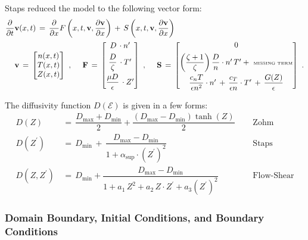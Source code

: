 \documentclass[a4paper,8pt]{article}
\begin{document}
Staps reduced the model to the following vector form:
\small\begin{align}
    \dfrac{\partial}{\partial t} \mathbf{v}&(x,t) \,=\, \dfrac{\partial}{\partial x} F\left(x, t, \mathbf{v}, \dfrac{\partial\mathbf{v}}{\partial x}\right) \,+\, S\left(x, t, \mathbf{v}, \dfrac{\partial\mathbf{v}}{\partial x}\right) \\
\mathbf{v}& \,=\,\begin{bmatrix} n(x, t) \\ T(x, t) \\ Z(x, t) \end{bmatrix}~,~~~~
\mathbf{F} \,=\, \begin{bmatrix}
            D\,\cdot n^\prime \\[1ex]
            \dfrac{D}{\zeta}\,\cdot T^\prime \\[2ex]
            \dfrac{\mu D}{\epsilon}\,\cdot Z^\prime
            \end{bmatrix}~,~~~~
\mathbf{S} \,=\, \begin{bmatrix}
            0 \\[1ex]
            \left(\dfrac{\zeta + 1}{\zeta}\right) \dfrac{D}{n} \cdot n^\prime \, T^\prime +~\tiny{\text{MISSING TERM}}\\[2ex]
            \dfrac{c_n T}{\epsilon n^2} \cdot n^\prime \,+\, \dfrac{c_T}{\epsilon n} \cdot T^\prime \,+\, \dfrac{G(Z)}{\epsilon}
            \end{bmatrix}~.
\end{align}\normalsize

The diffusivity function \(D(\mathcal{E})\) is given in a few forms:
\begin{align}
    D(Z) \,&=\, \dfrac{D_\text{max} + D_\text{min}}{2} + \dfrac{(D_\text{max} - D_\text{min})\tanh(Z)}{2} ~~~~~~ &\text{Zohm} \\
    D(Z^\prime) \,&=\, D_\text{min} \,+\, \dfrac{D_\text{max} - D_\text{min}}{1 + \alpha_\text{sup}\cdot(Z^\prime)^2} ~~~~~~ &\text{Staps} \\
    D(Z, Z^\prime) \,&=\, D_\text{min} + \dfrac{D_\text{max} - D_\text{min}}{1 + a_1\,Z^2 + a_2\,Z \cdot Z^\prime + a_3\left(Z^\prime\right)^2} ~~~~~~ &\text{Flow-Shear}
\end{align}

\hypertarget{domain-boundary-initial-conditions-and-boundary-conditions}{%
\subsubsection{Domain Boundary, Initial Conditions, and Boundary
Conditions}\label{domain-boundary-initial-conditions-and-boundary-conditions}}
\end{document}
